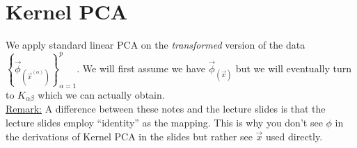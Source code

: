 
\section{Kernel PCA}

We apply standard linear PCA on the \emph{transformed} version of the data
$
\left\{
\vec{\phi}_{(\vec{x}^{(\alpha)})}
\right\}_{\alpha=1}^{p}
$.
We will first assume we have $\vec{\phi}_{(\vec{x})}$ 
but we will eventually turn to $K_{\alpha \beta}$ 
which we can actually obtain.\\

\underline{Remark:}
A difference between these notes and the lecture slides is that 
the lecture slides employ ``identity'' as the mapping. 
This is why you don't see $\phi$ in the derivations of Kernel PCA in the slides but rather see $\vec x$ used directly.\\

